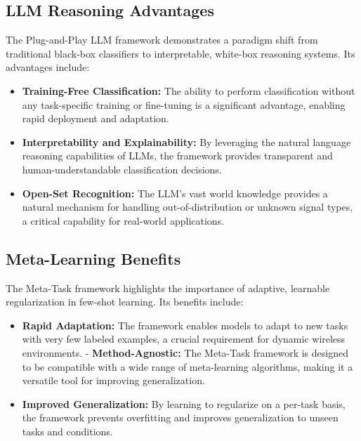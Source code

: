 \subsection{LLM Reasoning Advantages}
The Plug-and-Play LLM framework demonstrates a paradigm shift from traditional black-box classifiers to interpretable, white-box reasoning systems. Its advantages include:
\begin{itemize}
    \item \textbf{Training-Free Classification:} The ability to perform classification without any task-specific training or fine-tuning is a significant advantage, enabling rapid deployment and adaptation.
    \item \textbf{Interpretability and Explainability:} By leveraging the natural language reasoning capabilities of LLMs, the framework provides transparent and human-understandable classification decisions.
    \item \textbf{Open-Set Recognition:} The LLM's vast world knowledge provides a natural mechanism for handling out-of-distribution or unknown signal types, a critical capability for real-world applications.
\end{itemize}

\subsection{Meta-Learning Benefits}
The Meta-Task framework highlights the importance of adaptive, learnable regularization in few-shot learning. Its benefits include:
\begin{itemize}
    \item \textbf{Rapid Adaptation:} The framework enables models to adapt to new tasks with very few labeled examples, a crucial requirement for dynamic wireless environments.
    - \textbf{Method-Agnostic:} The Meta-Task framework is designed to be compatible with a wide range of meta-learning algorithms, making it a versatile tool for improving generalization.
    \item \textbf{Improved Generalization:} By learning to regularize on a per-task basis, the framework prevents overfitting and improves generalization to unseen tasks and conditions.
\end{itemize}

